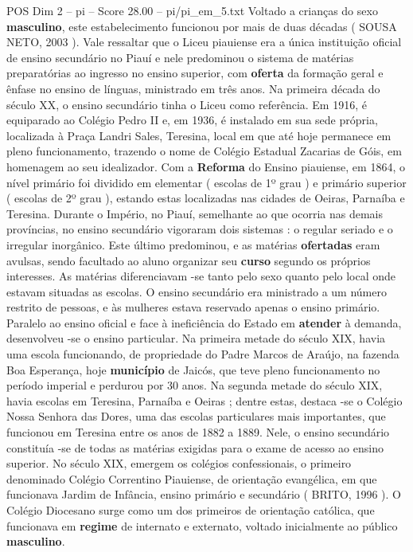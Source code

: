 \begin{textsample}{POS Dim 2 – pi – Score 28.00 – pi/pi\_em\_5.txt}
Voltado a crianças do sexo \textbf{masculino}, este estabelecimento funcionou por mais de duas décadas ( SOUSA NETO, 2003 ).
Vale ressaltar que o Liceu piauiense era a única instituição oficial de ensino secundário no Piauí e nele predominou o sistema de matérias preparatórias ao ingresso no ensino superior, com \textbf{oferta} da formação geral e ênfase no ensino de línguas, ministrado em três anos.
Na primeira década do século XX, o ensino secundário tinha o Liceu como referência.
Em 1916, é equiparado ao Colégio Pedro II e, em 1936, é instalado em sua sede própria, localizada à Praça Landri Sales, Teresina, local em que até hoje permanece em pleno funcionamento, trazendo o nome de Colégio Estadual Zacarias de Góis, em homenagem ao seu idealizador.
Com a \textbf{Reforma} do Ensino piauiense, em 1864, o nível primário foi dividido em elementar ( escolas de 1º grau ) e primário superior ( escolas de 2º grau ), estando estas localizadas nas cidades de Oeiras, Parnaíba e Teresina.
Durante o Império, no Piauí, semelhante ao que ocorria nas demais províncias, no ensino secundário vigoraram dois sistemas : o regular seriado e o irregular inorgânico.
Este último predominou, e as matérias \textbf{ofertadas} eram avulsas, sendo facultado ao aluno organizar seu \textbf{curso} segundo os próprios interesses.
As matérias diferenciavam -se tanto pelo sexo quanto pelo local onde estavam situadas as escolas.
O ensino secundário era ministrado a um número restrito de pessoas, e às mulheres estava reservado apenas o ensino primário.
Paralelo ao ensino oficial e face à ineficiência do Estado em \textbf{atender} à demanda, desenvolveu -se o ensino particular.
Na primeira metade do século XIX, havia uma escola funcionando, de propriedade do Padre Marcos de Araújo, na fazenda Boa Esperança, hoje \textbf{município} de Jaicós, que teve pleno funcionamento no período imperial e perdurou por 30 anos.
Na segunda metade do século XIX, havia escolas em Teresina, Parnaíba e Oeiras ; dentre estas, destaca -se o Colégio Nossa Senhora das Dores, uma das escolas particulares mais importantes, que funcionou em Teresina entre os anos de 1882 a 1889.
Nele, o ensino secundário constituía -se de todas as matérias exigidas para o exame de acesso ao ensino superior.
No século XIX, emergem os colégios confessionais, o primeiro denominado Colégio Correntino Piauiense, de orientação evangélica, em que funcionava Jardim de Infância, ensino primário e secundário ( BRITO, 1996 ).
O Colégio Diocesano surge como um dos primeiros de orientação católica, que funcionava em \textbf{regime} de internato e externato, voltado inicialmente ao público \textbf{masculino}.

\end{textsample}
